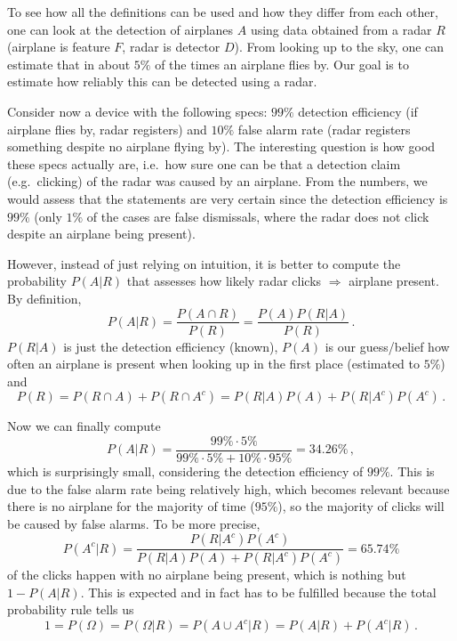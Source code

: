 \begin{ex}[Radar]
To see how all the definitions can be used and how they differ from each other, one can look at the detection of airplanes $A$ using data obtained from a radar $R$ (airplane is feature $F$, radar is detector $D$). From looking up to the sky, one can estimate that in about $5\%$ of the times an airplane flies by. Our goal is to estimate how reliably this can be detected using a radar.


Consider now a device with the following specs: $99\%$ detection efficiency (if airplane flies by, radar registers) and $10\%$ false alarm rate (radar registers something despite no airplane flying by). The interesting question is how good these specs actually are, i.e.~how sure one can be that a detection claim (e.g.~clicking) of the radar was caused by an airplane. From the numbers, we would assess that the statements are very certain since the detection efficiency is $99\%$ (only $1\%$ of the cases are false dismissals, where the radar does not click despite an airplane being present).

However, instead of just relying on intuition, it is better to compute the probability $P(A | R)$ that assesses how likely radar clicks $\Rightarrow$ airplane present. By definition,
\begin{equation*}
P(A | R) = \frac{P(A \cap R)}{P(R)} = \frac{P(A) P(R | A)}{P(R)} \, .
\end{equation*}
$P(R | A)$ is just the detection efficiency (known), $P(A)$ is our guess/belief how often an airplane is present when looking up in the first place (estimated to $5\%$) and%
\begin{equation*}
P(R) = P(R \cap A) + P(R \cap A^c) = P(R | A) P(A) + P(R | A^c) P(A^c) \, .
\end{equation*}

Now we can finally compute
\begin{equation*}
P(A | R) = \frac{99\% \cdot 5\%}{99\% \cdot 5\% + 10\% \cdot 95\%} = 34.26\% \, ,
\end{equation*}
which is surprisingly small, considering the detection efficiency of $99\%$. This is due to the false alarm rate being relatively high, which becomes relevant because there is no airplane for the majority of time ($95\%$), so the majority of clicks will be caused by false alarms. To be more precise,
\begin{equation*}
P(A^c | R) = \frac{P(R | A^c) P(A^c)}{P(R | A) P(A) + P(R | A^c) P(A^c)} = 65.74\%
\end{equation*}
of the clicks happen with no airplane being present, which is nothing but $1 - P(A | R)$. This is expected and in fact has to be fulfilled because the total probability rule tells us
\begin{equation*}
1 = P(\Omega) = P(\Omega | R) = P(A \cup A^c | R) = P(A | R) + P(A^c | R) \, .
\end{equation*}
\end{ex}


